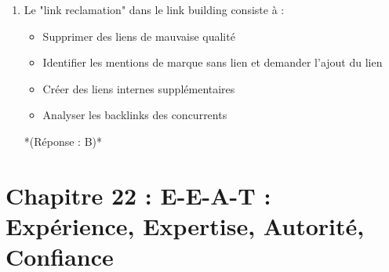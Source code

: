 \documentclass[12pt,a4paper,twoside]{report}
\begin{document}
\begin{enumerate}
\item Le "link reclamation" dans le link building consiste à :
\begin{itemize}
\item[A)] Supprimer des liens de mauvaise qualité
\item[B)] Identifier les mentions de marque sans lien et demander l'ajout du lien
\item[C)] Créer des liens internes supplémentaires
\item[D)] Analyser les backlinks des concurrents
\end{itemize}
*(Réponse : B)*
\end{enumerate}
\section*{Chapitre 22 : E-E-A-T : Expérience, Expertise, Autorité, Confiance}
\end{document}
